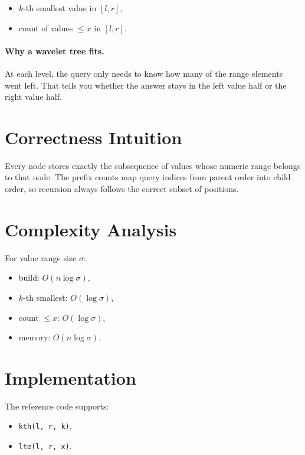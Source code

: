 \begin{itemize}
  \item \(k\)-th smallest value in \([l, r]\),
  \item count of values \(\le x\) in \([l, r]\).
\end{itemize}

\paragraph{Why a wavelet tree fits.}
At each level, the query only needs to know how many of the range elements went left. That tells you whether the answer
stays in the left value half or the right value half.

\section*{Correctness Intuition}

Every node stores exactly the subsequence of values whose numeric range belongs to that node. The prefix counts map query
indices from parent order into child order, so recursion always follows the correct subset of positions.

\section*{Complexity Analysis}

For value range size \(\sigma\):

\begin{itemize}
  \item build: \(O(n \log \sigma)\),
  \item \(k\)-th smallest: \(O(\log \sigma)\),
  \item count \(\le x\): \(O(\log \sigma)\),
  \item memory: \(O(n \log \sigma)\).
\end{itemize}

\section*{Implementation}

The reference code supports:

\begin{itemize}
  \item \texttt{kth(l, r, k)},
  \item \texttt{lte(l, r, x)}.
\end{itemize}

